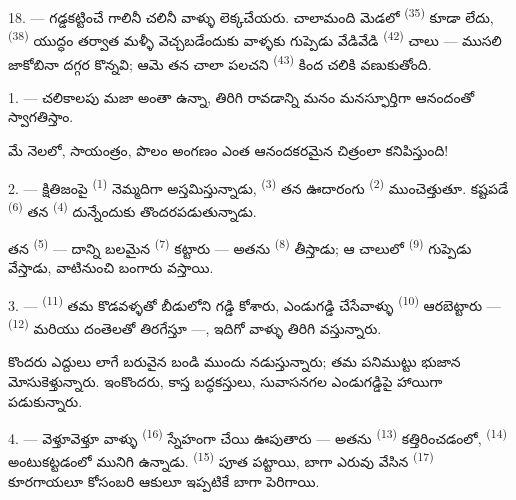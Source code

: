 18. --- గడ్డకట్టించే గాలినీ చలినీ వాళ్ళు లెక్కచేయరు. చాలామంది మెడలో 
\textsuperscript{(35)} కూడా లేదు,  \textsuperscript{(38)} యుద్ధం తర్వాత
మళ్ళీ వెచ్చబడేందుకు వాళ్ళకు గుప్పెడు వేడివేడి  \textsuperscript{(42)}
చాలు — ముసలి  జాకోబినా దగ్గర కొన్నవి; ఆమె తన చాలా పలచని 
\textsuperscript{(43)} కింద చలికి వణుకుతోంది.

\VUsaut{3.0mm}
\VUsaut{3.0mm}

\VUsaut{4.0mm}

1. --- చలికాలపు మజా అంతా ఉన్నా,  తిరిగి రావడాన్ని మనం మనస్ఫూర్తిగా ఆనందంతో
స్వాగతిస్తాం.

మే నెలలో, సాయంత్రం, పొలం అంగణం ఎంత ఆనందకరమైన చిత్రంలా కనిపిస్తుంది!

2. --- క్షితిజంపై  \textsuperscript{(1)} నెమ్మదిగా అస్తమిస్తున్నాడు,
 \textsuperscript{(3)} తన ఊదారంగు  \textsuperscript{(2)}
ముంచెత్తుతూ. కష్టపడే  \textsuperscript{(6)} తన 
\textsuperscript{(4)} దున్నేందుకు తొందరపడుతున్నాడు.

తన  \textsuperscript{(5)} — దాన్ని బలమైన 
\textsuperscript{(7)} కట్టారు — అతను  \textsuperscript{(8)} తీస్తాడు; ఆ చాలులో
 \textsuperscript{(9)} గుప్పెడు  వేస్తాడు,
వాటినుంచి బంగారు  వస్తాయి.

3. ---  \textsuperscript{(11)} తమ కొడవళ్ళతో బీడులోని గడ్డి కోశారు,
ఎండుగడ్డి చేసేవాళ్ళు  \textsuperscript{(10)} ఆరబెట్టారు —
 \textsuperscript{(12)} మరియు దంతెలతో తిరగేస్తూ —, ఇదిగో వాళ్ళు తిరిగి
వస్తున్నారు.

కొందరు ఎద్దులు లాగే బరువైన బండి ముందు నడుస్తున్నారు; తమ పనిముట్టు భుజాన మోసుకెళ్తున్నారు.
ఇంకొందరు, కాస్త బద్ధకస్తులు, సువాసనగల ఎండుగడ్డిపై హాయిగా పడుకున్నారు.

4. --- వెళ్తూవెళ్తూ వాళ్ళు  \textsuperscript{(16)} స్నేహంగా చేయి ఊపుతారు —
అతను  \textsuperscript{(13)}  కత్తిరించడంలో,
 \textsuperscript{(14)} అంటుకట్టడంలో మునిగి ఉన్నాడు.
 \textsuperscript{(15)} పూత పట్టాయి, బాగా ఎరువు వేసిన
 \textsuperscript{(17)} కూరగాయలూ  కోసంబరి ఆకులూ
ఇప్పటికే బాగా పెరిగాయి.

